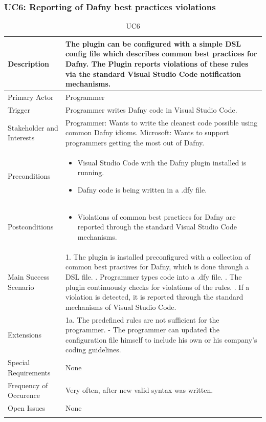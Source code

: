 \subsubsection{UC6: Reporting of Dafny best practices violations}
\begin{longtable}{l | p{} }
	Description & The plugin can be configured with a simple DSL config file which describes common best practices for Dafny. The Plugin reports violations of these rules via the standard Visual Studio Code notification mechanisms.\\ \hline
	Primary Actor & Programmer\\ \hline
	Trigger & Programmer writes Dafny code in Visual Studio Code.\\ \hline
	Stakeholder and Interests & Programmer: Wants to write the cleanest code possible using common Dafny idioms. \newline Microsoft: Wants to support programmers getting the most out of Dafny.\\ \hline
	Preconditions &
	\begin{itemize}
		\item Visual Studio Code with the Dafny plugin installed is running.
		\item Dafny code is being written in a .dfy file.
	\end{itemize}\\ \hline
	Postconditions &
	\begin{itemize}
		\item Violations of common best practices for Dafny are reported through the standard Visual Studio Code mechanisms.
	\end{itemize}\\ \hline
	Main Success Scenario & 
	1. The plugin is installed preconfigured with a collection of common best practives for Dafny, which is done through a DSL file. \newline
	2. Programmer types code into a .dfy file. \newline 
	3. The plugin continuously checks for violations of the rules. \newline 
	4. If a violation is detected, it is reported through the standard mechanisms of Visual Studio Code.\\ \hline
	Extensions & 
	1a. The predefined rules are not sufficient for the programmer. \newline 
	- The programmer can updated the configuration file himself to include his own or his company's coding guidelines. \\ \hline
	Special Requirements & None\\ \hline
	Frequency of Occurence & Very often, after new valid syntax was written.\\ \hline
	Open Issues & None \\ \hline
	\caption{UC6}
\end{longtable}

